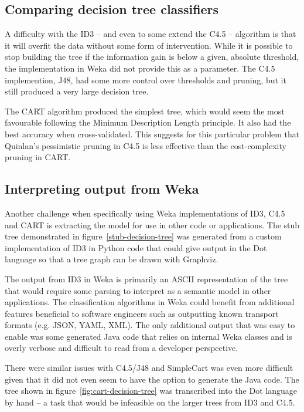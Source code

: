 \documentclass[11pt,a4paper]{article}
\begin{document}
\subsection{Comparing decision tree classifiers}

A difficulty with the ID3 -- and even to some extend the C4.5 -- algorithm
is that it will overfit the data without some form of intervention. While
it is possible to stop building the tree if the information gain is below
a given, absolute threshold, the implementation in Weka did not provide this
as a parameter. The C4.5 implemention, J48, had some more control over
thresholds and pruning, but it still produced a very large decision tree.

The CART algorithm produced the simplest tree, which would seem the most
favourable following the Minimum Description Length principle. It also
had the best accuracy when cross-validated. This suggests for this
particular problem that Quinlan's pessimistic pruning in C4.5 is less
effective than the cost-complexity pruning in CART.

\subsection{Interpreting output from Weka}

Another challenge when specifically using Weka implementations of ID3,
C4.5 and CART is extracting the model for use in other code or applications.
The stub tree demonstrated in figure~\ref{stub-decision-tree} was generated
from a custom implementation of ID3 in Python code that could give output
in the Dot language so that a tree graph can be drawn with Graphviz.

The output from ID3 in Weka is primarily an ASCII representation of the tree
that would require some parsing to interpret as a semantic model in
other applications. The classification algorithms in Weka could benefit
from additional features beneficial to software engineers such as outputting
known transport formats (e.g. JSON, YAML, XML). The only additional output that
was easy to enable was some generated Java code that relies on internal Weka
classes and is overly verbose and difficult to read from a developer
perspective.

There were similar issues with C4.5/J48 and SimpleCart was even more difficult
given that it did not even seem to have the option to generate the Java code.
The tree shown in figure~\ref{fig:cart-decision-tree} was transcribed
into the Dot language by hand -- a task that would be infeasible on the larger
trees from ID3 and C4.5.
\end{document}

